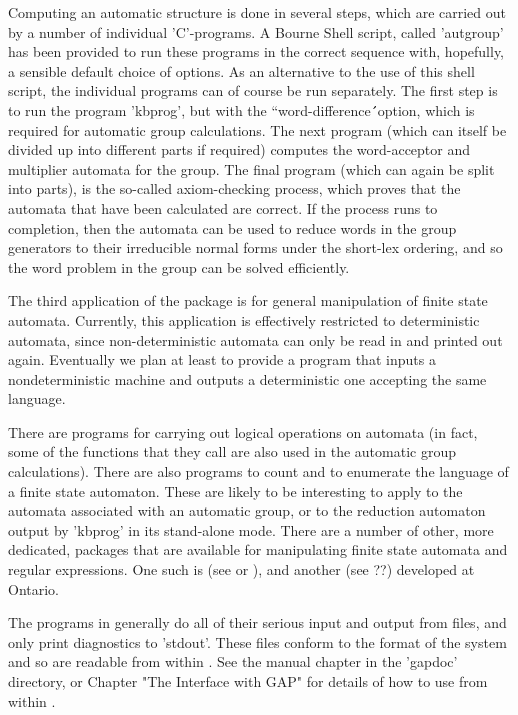 Computing an automatic structure is done in several steps, which are
carried out by a number of individual 'C'-programs. A Bourne Shell script,
called 'autgroup' has been provided to run these programs in the correct
sequence with, hopefully, a sensible default choice of options. As an
alternative to the use of this shell script, the individual programs can of
course be run separately. The first step is to run the program
'kbprog', but with the ``word-difference\'\'\ option, which is required
for automatic group calculations. The next program (which can itself be
divided up into different parts if required) computes the word-acceptor
and multiplier automata for the group. The final program (which can again
be split into parts), is the so-called axiom-checking process, which proves
that the automata that have been calculated are correct.
If the process runs to completion, then the automata can be used to reduce
words in the group generators to their irreducible normal forms under the
short-lex ordering, and so the word problem in the group can be solved
efficiently.

The third application of the package is for general manipulation of finite
state automata. Currently, this application is effectively restricted to
deterministic automata, since non-deterministic automata can only be read in and
printed out again. Eventually we plan at least to provide a program that
inputs a nondeterministic machine and outputs a deterministic one accepting
the same language.

There are programs for carrying out logical operations
on automata (in fact, some of the functions that they call are also used
in the automatic group calculations).  There are also programs to count
and to enumerate the language of a finite state automaton. These are
likely to be interesting to apply to the automata associated with
an automatic group, or to the reduction automaton output by 'kbprog' in
its stand-alone mode. There are a number of other, more dedicated,
packages that are available for manipulating finite state automata and
regular expressions. One such is {\Automate} (see \cite{Rie87} or
\cite{ChH91}), and another {\Grail} (see ??) developed at Ontario.

The programs in {\KBMAG} generally do all of their serious input and output
from files, and only print diagnostics to 'stdout'. These files conform to
the format of the  {\GAP} system \cite{Sch92} and so are readable from
within {\GAP}. See the {\GAP} manual chapter in the 'gapdoc' directory, or
Chapter "The Interface with GAP" for details of how to use {\KBMAG} from within 
{\GAP}.


